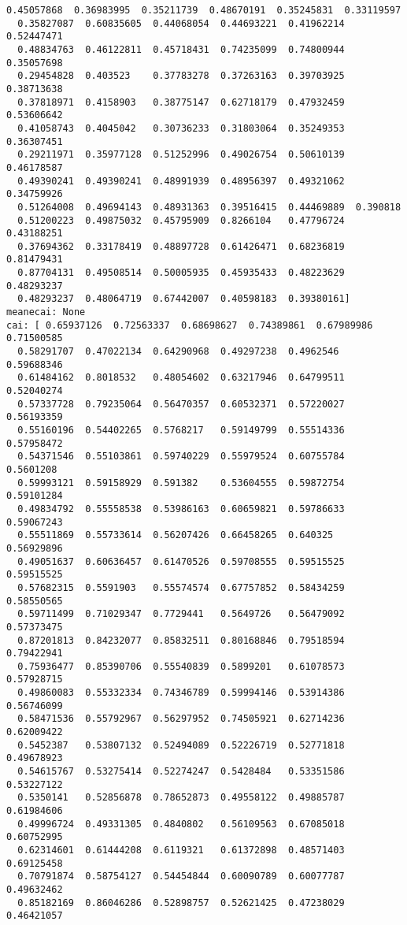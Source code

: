 \documentclass[11pt]{article}
\begin{document}
\begin{Verbatim}[commandchars=\\\{\}]
  0.45057868  0.36983995  0.35211739  0.48670191  0.35245831  0.33119597
  0.35827087  0.60835605  0.44068054  0.44693221  0.41962214  0.52447471
  0.48834763  0.46122811  0.45718431  0.74235099  0.74800944  0.35057698
  0.29454828  0.403523    0.37783278  0.37263163  0.39703925  0.38713638
  0.37818971  0.4158903   0.38775147  0.62718179  0.47932459  0.53606642
  0.41058743  0.4045042   0.30736233  0.31803064  0.35249353  0.36307451
  0.29211971  0.35977128  0.51252996  0.49026754  0.50610139  0.46178587
  0.49390241  0.49390241  0.48991939  0.48956397  0.49321062  0.34759926
  0.51264008  0.49694143  0.48931363  0.39516415  0.44469889  0.390818
  0.51200223  0.49875032  0.45795909  0.8266104   0.47796724  0.43188251
  0.37694362  0.33178419  0.48897728  0.61426471  0.68236819  0.81479431
  0.87704131  0.49508514  0.50005935  0.45935433  0.48223629  0.48293237
  0.48293237  0.48064719  0.67442007  0.40598183  0.39380161]
meanecai: None
cai: [ 0.65937126  0.72563337  0.68698627  0.74389861  0.67989986  0.71500585
  0.58291707  0.47022134  0.64290968  0.49297238  0.4962546   0.59688346
  0.61484162  0.8018532   0.48054602  0.63217946  0.64799511  0.52040274
  0.57337728  0.79235064  0.56470357  0.60532371  0.57220027  0.56193359
  0.55160196  0.54402265  0.5768217   0.59149799  0.55514336  0.57958472
  0.54371546  0.55103861  0.59740229  0.55979524  0.60755784  0.5601208
  0.59993121  0.59158929  0.591382    0.53604555  0.59872754  0.59101284
  0.49834792  0.55558538  0.53986163  0.60659821  0.59786633  0.59067243
  0.55511869  0.55733614  0.56207426  0.66458265  0.640325    0.56929896
  0.49051637  0.60636457  0.61470526  0.59708555  0.59515525  0.59515525
  0.57682315  0.5591903   0.55574574  0.67757852  0.58434259  0.58550565
  0.59711499  0.71029347  0.7729441   0.5649726   0.56479092  0.57373475
  0.87201813  0.84232077  0.85832511  0.80168846  0.79518594  0.79422941
  0.75936477  0.85390706  0.55540839  0.5899201   0.61078573  0.57928715
  0.49860083  0.55332334  0.74346789  0.59994146  0.53914386  0.56746099
  0.58471536  0.55792967  0.56297952  0.74505921  0.62714236  0.62009422
  0.5452387   0.53807132  0.52494089  0.52226719  0.52771818  0.49678923
  0.54615767  0.53275414  0.52274247  0.5428484   0.53351586  0.53227122
  0.5350141   0.52856878  0.78652873  0.49558122  0.49885787  0.61984606
  0.49996724  0.49331305  0.4840802   0.56109563  0.67085018  0.60752995
  0.62314601  0.61444208  0.6119321   0.61372898  0.48571403  0.69125458
  0.70791874  0.58754127  0.54454844  0.60090789  0.60077787  0.49632462
  0.85182169  0.86046286  0.52898757  0.52621425  0.47238029  0.46421057

\end{Verbatim}
\end{document}
